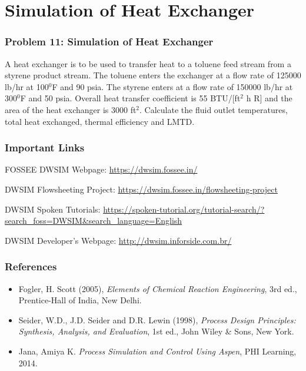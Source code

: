 \documentclass[10pt]{beamer}
\begin{document}
\section{Simulation of Heat Exchanger}
\begin{frame}
\frametitle{Problem 11: Simulation of Heat Exchanger}
A heat exchanger is to be used to transfer heat to a toluene feed stream from a styrene product stream. The toluene enters the exchanger at a flow rate of 125000 lb/hr at 100$^0$F and 90 psia. The styrene enters at a flow rate of 150000 lb/hr at 300$^0$F and 50 psia. Overall heat transfer coefficient is 55 BTU/[ft$^2$ h R] and the area of the heat exchanger is 3000 ft$^2$. Calculate the fluid outlet temperatures, total heat exchanged, thermal efficiency and LMTD.
\end{frame}

\begin{frame}
\frametitle{Important Links}

FOSSEE DWSIM Webpage: \newline \url{https://dwsim.fossee.in/}

\vspace{3ex}

DWSIM Flowsheeting Project: \url{https://dwsim.fossee.in/flowsheeting-project}

\vspace{3ex}

DWSIM Spoken Tutorials: \url{https://spoken-tutorial.org/tutorial-search/?search_foss=DWSIM&search_language=English}

\vspace{3ex}

DWSIM Developer's Webpage: \url{http://dwsim.inforside.com.br/}

\end{frame}

\begin{frame}
\frametitle{References}
\begin{itemize}
\item Fogler, H. Scott (2005), \textit{Elements of Chemical Reaction Engineering}, 3rd ed., Prentice-Hall of India, New Delhi.
\vspace{2ex}
\item Seider, W.D., J.D. Seider and D.R. Lewin (1998), \textit{Process Design Principles: Synthesis, Analysis, and Evaluation}, 1st ed., John Wiley \& Sons, New York.
\vspace{2ex}
\item Jana, Amiya K. \textit{Process Simulation and Control Using Aspen}, PHI Learning, 2014. 
\end{itemize}

\end{frame}
\end{document}
